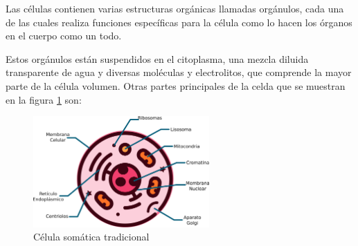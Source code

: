 \documentclass{beamer}
\begin{document}

\begin{frame}
	
	\begin{block}{}
	   Las células contienen varias estructuras orgánicas llamadas orgánulos, cada una de las cuales realiza funciones específicas para la célula como lo hacen los órganos en el cuerpo como un todo.\\
	   	
	\end{block}
	
	
	\begin{block}{}
	  Estos orgánulos están suspendidos en el citoplasma, una mezcla diluida transparente de agua y diversas moléculas y electrolitos, que comprende la mayor parte de la célula volumen. Otras partes principales de la celda que se muestran en la figura \ref{celula}  son:\\		
	\end{block}
	
\end{frame}


\begin{frame}
  \begin{figure}[h!]
  	\centering
  	\includegraphics[width=0.6\textwidth]{celula.png}
  	\caption{Célula somática tradicional}
  	\label{celula}
  \end{figure}	
\end{frame}


\begin{frame}
	\begin{figure}
		\begin{minipage}[t][3.5cm]{\textwidth}
			\begin{center}
				\smartdiagramset{
					back arrow disabled=true,
					additions={
						additional item offset=0.85cm,
						additional item border color=blue,
					}
				}
			\end{center}
		\end{minipage}
		\caption{}
		\label{tiposCelulas}
	\end{figure}	
\end{frame}
\end{document}
